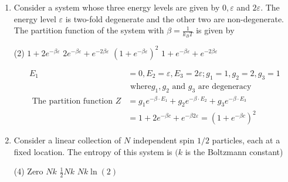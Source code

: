 \begin{enumerate}
{}
\begin{tasks}(4)
\task[\textbf{A.}] $V_{F} \propto n^{2 / 3}$
\task[\textbf{B.}]  $V_{F} \propto n$
\task[\textbf{C.}] $V_{F} \propto n^{1 / 2}$
\task[\textbf{D.}] $V_{F} \propto n^{1 / 3}$
\end{tasks}
\begin{answer}
\begin{align*}
E_{F}&=\frac{1}{2} m V_{F}^{2} \quad \because E_{F} \propto n^{2 / 3} \Rightarrow V_{F}^{2} \propto n^{2 / 3} \Rightarrow V_{F} \propto n^{1 / 3}
\end{align*}
So the correct answer is \textbf{Option (D)}
\end{answer}
	\item Consider a system whose three energy levels are given by $0, \varepsilon$ and $2 \varepsilon$. The energy level $\varepsilon$ is two-fold degenerate and the other two are non-degenerate. The partition function of the system with $\beta=\frac{1}{k_{B} T}$ is given by
{	}
\begin{tasks}(2)
\task[\textbf{A.}] $1+2 e^{-\beta \varepsilon}$
\task[\textbf{B.}] $2 e^{-\beta \varepsilon}+e^{-2 \beta \varepsilon}$
\task[\textbf{C.}] $\left(1+e^{-\beta \varepsilon}\right)^{2}$
\task[\textbf{D.}] $1+e^{-\beta \varepsilon}+e^{-2 \beta \varepsilon}$
\end{tasks}
\begin{answer}
\begin{align*}
E_{1}&=0, E_{2}=\varepsilon, E_{3}=2 \varepsilon ; g_{1}=1, g_{2}=2, g_{3}=1\\&\text{ where} g_{1}, g_{2}\text{ and }g_{3}\text{ are degeneracy}\\
\text{	The partition function }Z&=g_{1} e^{-\beta \cdot E_{1}}+g_{2} e^{-\beta \cdot E_{2}}+g_{3} e^{-\beta \cdot E_{3}}\\&=1+2 e^{-\beta c}+e^{-\beta 2 \varepsilon}=\left(1+e^{-\beta c}\right)^{2}
\end{align*}
\end{answer}
	\item Consider a linear collection of $N$ independent spin $1 / 2$ particles, each at a fixed location. The entropy of this system is $(k$ is the Boltzmann constant)
{	}
\begin{tasks}(4)
\task[\textbf{A.}] Zero
\task[\textbf{B.}]  $N k$
\task[\textbf{C.}]  $\frac{1}{2} N k$
\task[\textbf{D.}] $N k \ln (2)$
\end{tasks}
\begin{answer}

\end{answer}
\end{enumerate}
